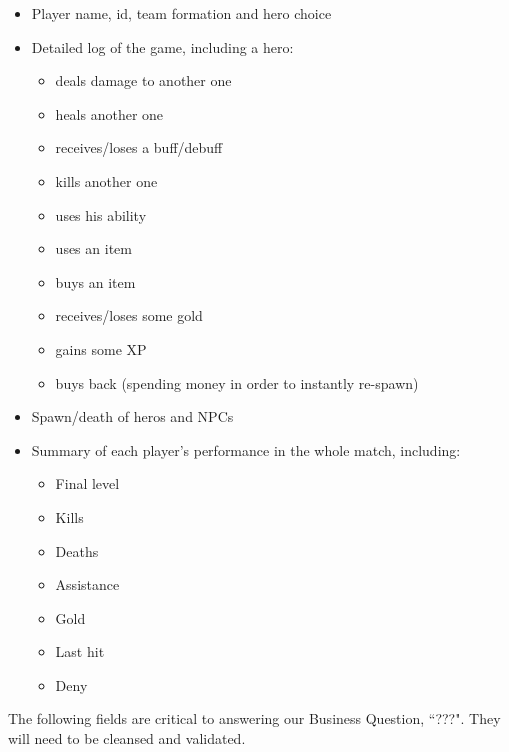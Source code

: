 \documentclass{article}
\begin{document}
\begin{itemize}
	\item Player name, id, team formation and hero choice
	\item Detailed log of the game, including a hero:
	\begin{itemize}
		\item deals damage to another one
		\item heals another one
		\item receives/loses a buff/debuff
		\item kills another one
		\item uses his ability
		\item uses an item
		\item buys an item
		\item receives/loses some gold
		\item gains some XP
		\item buys back (spending money in order to instantly re-spawn)
	\end{itemize}
	\item Spawn/death of heros and NPCs
	\item Summary of each player's performance in the whole match, including:
	\begin{itemize}
		\item Final level
		\item Kills
		\item Deaths
		\item Assistance
		\item Gold
		\item Last hit
		\item Deny
	\end{itemize}
\end{itemize}







The following fields are critical to answering our Business Question, ``???".
They will need to be cleansed and validated.




\end{document}

